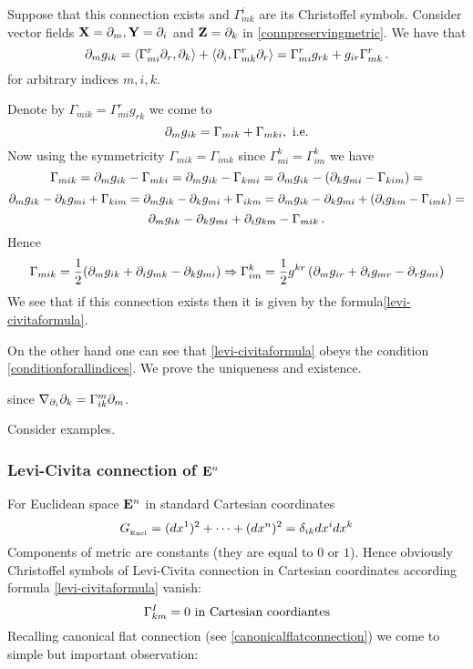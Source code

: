 \documentclass[12pt]{article}
\theoremstyle{theorem}
\numberwithin{equation}{section}
\begin{document}
{\footnotesize Suppose that this connection exists and $\Gamma^i_{mk}$ are its Christoffel symbols.
 Consider vector fields ${\bf X}=\partial_m,{\bf Y}=\partial_i$ and ${\bf Z}=\partial_k$ in \eqref{connpreservingmetric}.
  We have that
            \begin{equation}\label{conditionforallindices}
         \partial_mg_{ik}=\langle\Gamma_{mi}^r\partial_r,\partial_k\rangle+\langle\partial_i,\Gamma^r_{mk}\partial_r\rangle=
              \Gamma^r_{mi}g_{rk}+g_{ir}\Gamma^r_{mk}\,.
            \end{equation}
   for arbitrary indices $m,i,k$.

    Denote by $\Gamma_{mik}=\Gamma^r_{mi}g_{rk}$ we come to
                $$
          \partial_mg_{ik}=\Gamma_{mik}+\Gamma_{mki}, \,\,{\rm i.e.}
                $$
    Now using the symmetricity $\Gamma_{mik}=\Gamma_{imk}$ since $\Gamma_{mi}^k=\Gamma_{im}^k$ we have
                $$
    \Gamma_{mik}=\partial_mg_{ik}-\Gamma_{mki}=\partial_mg_{ik}-\Gamma_{kmi}=\partial_mg_{ik}-\left(\partial_kg_{mi}-\Gamma_{kim}\right)=
                $$
                $$
\partial_mg_{ik}-\partial_kg_{mi}+\Gamma_{kim}=\partial_mg_{ik}-\partial_kg_{mi}+\Gamma_{ikm}=
\partial_mg_{ik}-\partial_kg_{mi}+\left(\partial_ig_{km}-\Gamma_{imk}\right)=
                $$
                $$
       \partial_mg_{ik}-\partial_kg_{mi}+\partial_ig_{km}-\Gamma_{mik}\,.
                $$
 Hence
                \begin{equation}\label{levi-vivitaforlowerindices}
   \Gamma_{mik}={1\over 2}(\partial_mg_{ik}+\partial_ig_{mk}-\partial_kg_{mi})\Rightarrow \Gamma^k_{im}=
   {1\over 2}g^{kr}\left(\partial_mg_{ir}+\partial_ig_{mr}-\partial_rg_{mi}\right)
                \end{equation}
  We see that if this connection exists then it is given by the formula\eqref{levi-civitaformula}.

  On the other hand one can see that \eqref{levi-civitaformula} obeys the condition
  \eqref{conditionforallindices}. We prove the uniqueness and existence.

since $\nabla_{\partial_i}\partial_k=\Gamma_{ik}^m\partial_m$.}

\m


Consider examples.

\subsubsection{Levi-Civita connection of ${\bf E}^n$}\label{canonicalflat=levicivita}

For Euclidean space ${\bf E}^n$ in standard Cartesian coordinates
               $$
               G_{_{\rm Eucl}}=(dx^1)^2+\dots+(dx^n)^2=\delta_{ik}dx^idx^k
               $$
    Components of metric are constants (they are equal to $0$ or $1$). Hence obviously
    Christoffel symbols of Levi-Civita connection in Cartesian coordinates according
    formula \eqref{levi-civitaformula} vanish:
               $$
              \Gamma^I_{km}=0 \hbox {\,\,in Cartesian coordiantes}
               $$
Recalling canonical flat connection (see \ref{canonicalflatconnection})
we come to simple but important observation:
\end{document}
